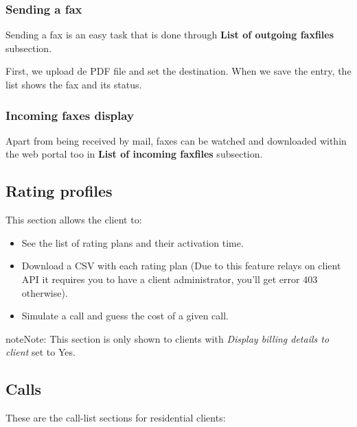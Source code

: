 \documentclass[letterpaper,10pt,english]{sphinxmanual}
\begin{document}
\subsubsection{Sending a fax}
\label{administration_portal/client/residential/faxes:sending-a-fax}
Sending a fax is an easy task that is done through \textbf{List of outgoing faxfiles} subsection.

First, we upload de PDF file and set the destination. When we save the entry, the list shows the fax and its status.


\subsubsection{Incoming faxes display}
\label{administration_portal/client/residential/faxes:incoming-faxes-display}
Apart from being received by mail, faxes can be watched and downloaded within
the web portal too in \textbf{List of incoming faxfiles} subsection.


\subsection{Rating profiles}
\label{administration_portal/client/residential/rating_profiles:rating-profiles}\label{administration_portal/client/residential/rating_profiles::doc}
This section allows the client to:
\begin{itemize}
\item {} 
See the list of rating plans and their activation time.

\item {} 
Download a CSV with each rating plan (Due to this feature relays on client API it requires you to have a client administrator, you'll get error 403 otherwise).

\item {} 
Simulate a call and guess the cost of a given call.

\end{itemize}

\begin{notice}{note}{Note:}
This section is only shown to clients with \emph{Display billing details to client} set to Yes.
\end{notice}


\subsection{Calls}
\label{administration_portal/client/residential/calls/index::doc}\label{administration_portal/client/residential/calls/index:calls}
These are the call-list sections for residential clients:
\end{document}
